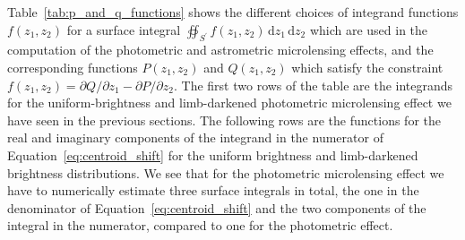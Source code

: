 \documentclass[12pt,dvipsnames]{report}
\newcommand{\ud}{\,\mathrm{d}}
\begin{document}
Table~\ref{tab:p_and_q_functions} shows the different choices of integrand functions 
$f(z_1,z_2)$ for a surface integral  $\oiint_{{S}^\prime}f(z_1,z_2)\ud z_1\ud z_2$ which 
are used in the computation of the photometric and astrometric microlensing effects, and 
the corresponding functions $P(z_1,z_2)$ and $Q(z_1,z_2)$ which satisfy the constraint
$f(z_1, z_2) = \partial Q/\partial z_1 - \partial P/\partial z_2$.
The first two rows of the table are the integrands for the uniform-brightness 
and limb-darkened photometric microlensing effect we have seen in the previous sections.
The following rows are the functions for the real and imaginary components of the integrand 
in the numerator of Equation~\ref{eq:centroid_shift} for the uniform brightness and 
limb-darkened brightness  distributions.
We see that for the photometric microlensing effect we have to numerically estimate three 
surface integrals in total, the one in the denominator of Equation~\ref{eq:centroid_shift} 
and the two components of the integral in the numerator, compared to one for the photometric 
effect. 
\end{document}
